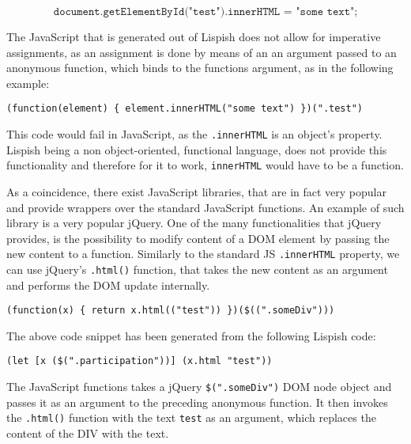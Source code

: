$$ \texttt{document.getElementById("test").innerHTML = "some text";} $$


The JavaScript that is generated out of Lispish does not allow for imperative assignments, as an assignment is done by means of an an argument passed to an anonymous function, which binds to the functions argument, as in the following 
example:  

\begin{verbatim}
(function(element) { element.innerHTML("some text") })(".test")
\end{verbatim}


This code would fail in JavaScript, as the \texttt{.innerHTML} is an object's property. Lispish being a non object-oriented, functional language, does not provide this functionality and therefore for it to work, \texttt{innerHTML} would have to be a function.

As a coincidence, there exist JavaScript libraries, that are in fact very popular and provide wrappers over the standard JavaScript functions.
An example of such library is a very popular jQuery\cite{jquery}. 
One of the many functionalities that jQuery provides, is the possibility to modify content of a DOM element by passing the new content to a function.
Similarly to the standard JS \texttt{.innerHTML} property, we can use jQuery's \texttt{.html()} function, that takes the new content as an argument and performs the DOM update internally. 

\begin{verbatim}
(function(x) { return x.html(("test")) })($((".someDiv")))
\end{verbatim}

The above code snippet has been generated from the following Lispish code:

\begin{verbatim}
(let [x ($(".participation"))] (x.html "test"))
\end{verbatim}

The JavaScript functions takes a jQuery \texttt{\$(".someDiv")} DOM node object and passes it as an argument to the preceding anonymous function.
It then invokes the \texttt{.html()} function with the text \texttt{test} as an argument, which replaces the content of the DIV with the text.









